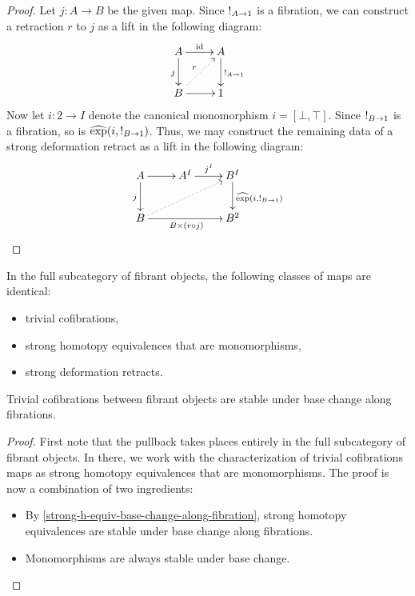 \documentclass[reqno,10pt,a4paper,oneside]{amsart}
\begin{document}
\begin{proof}
Let $j : A \to B$ be the given map.
Since $\mathord{!}_{A \to 1}$ is a fibration, we can construct a retraction $r$ to $j$ as a lift in the following diagram:
\[
\xymatrix{
  A
  \ar[r]^{\id}
  \ar[d]_{j}
&
  A
  \ar[d]^{\canonical_{A \to 1}}
\\
  B
  \ar[r]
  \ar@{.>}[ur]^{r}
&
  1
}
\]
Now let $i : 2 \to I$ denote the canonical monomorphism $i = [\bot, \top]$.
Since $\mathord{!}_{B \to 1}$ is a fibration, so is $\operatorname{\widehat{exp}}(i, \mathord{!}_{B \to 1})$.
Thus, we may construct the remaining data of a strong deformation retract as a lift in the following diagram:
\[
\xymatrix{
  A
  \ar[r]
  \ar[d]_{j}
&
  A^I
  \ar[r]^{j^I}
&
  B^I
  \ar[d]^{\hatexp(i, \canonical_{B \to 1})}
\\
  B
  \ar[rr]_{B \times (r \cc j)}
  \ar@{.>}[urr]
&&
  B^2
}
\]
\end{proof}

\begin{corollary}
\label{anodyne-between-fibrant-characterization}
In the full subcategory of fibrant objects, the following classes of maps are identical:
\begin{itemize}
\item
trivial cofibrations,
\item
strong homotopy equivalences that are monomorphisms,
\item
strong deformation retracts.
\end{itemize}
\end{corollary}

\begin{lemma}
\label{fibration-base-change-of-anodyne-between-fibrant}
Trivial cofibrations between fibrant objects are stable under base change along fibrations.
\end{lemma}

\begin{proof}
First note that the pullback takes places entirely in the full subcategory of fibrant objects.
In there, we work with the characterization of trivial cofibrations maps as strong homotopy equivalences that are monomorphisms.
The proof is now a combination of two ingredients:
\begin{itemize}
\item
By \cref{strong-h-equiv-base-change-along-fibration}, strong homotopy equivalences are stable under base change along fibrations.
\item
Monomorphisms are always stable under base change.
\end{itemize}
\end{proof}
\end{document}
